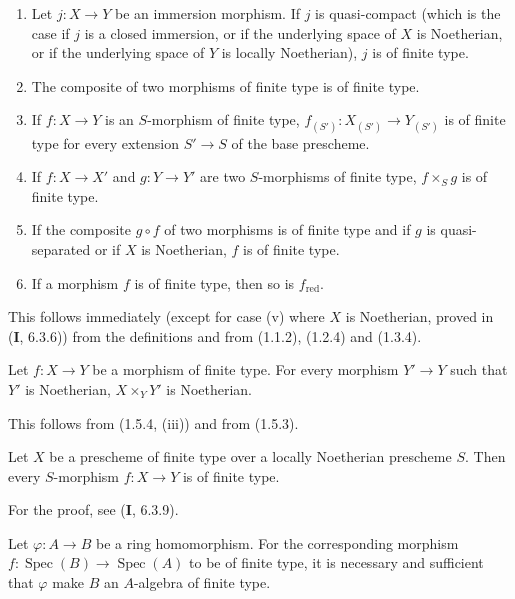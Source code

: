 \begin{proposition}[1.5.4]
\label{IV.1.5.4}
\begin{enumerate}
  \item[\textup{(i)}] Let $j:X\to Y$ be an immersion morphism. If $j$ is
  quasi-compact (which is the case if $j$ is a closed immersion, or if
  the underlying space of $X$ is Noetherian, or if the underlying space of
  $Y$ is locally Noetherian), $j$ is of finite type.
  \item[\textup{(ii)}] The composite of two morphisms of finite type is of finite type.
  \item[\textup{(iii)}] If $f:X\to Y$ is an $S$-morphism of finite type,
  $f_{(S')}:X_{(S')}\to Y_{(S')}$ is of finite type for every extension
  $S'\to S$ of the base prescheme.
  \item[\textup{(iv)}] If $f:X\to X'$ and $g:Y\to Y'$ are two $S$-morphisms of finite
  type, $f\times_Sg$ is of finite type.
  \item[\textup{(v)}] If the composite $g\circ f$ of two morphisms is of finite type
  and if $g$ is quasi-separated or if $X$ is Noetherian, $f$ is of finite type.
  \item[\textup{(vi)}] If a morphism $f$ is of finite type, then so is
  $f_{\mathrm{red}}$.
\end{enumerate}
\end{proposition}

This follows immediately (except for case (v) where $X$ is Noetherian, proved
in (\textbf{I}, 6.3.6)) from the definitions and from (1.1.2), (1.2.4) and (1.3.4).

\begin{corollary}[1.5.5]
\label{IV.1.5.5}
Let $f:X\to Y$ be a morphism of finite type. For every morphism $Y'\to Y$
such that $Y'$ is Noetherian, $X\times_YY'$ is Noetherian.
\end{corollary}

This follows from (1.5.4, (iii)) and from (1.5.3).

\begin{corollary}[1.5.6]
\label{IV.1.5.6}
Let $X$ be a prescheme of finite type over a locally Noetherian prescheme $S$.
Then every $S$-morphism $f:X\to Y$ is of finite type.
\end{corollary}

For the proof, see (\textbf{I}, 6.3.9).

\begin{proposition}[1.5.7]
\label{IV.1.5.7}
Let $\varphi:A\to B$ be a ring homomorphism. For the corresponding
morphism $f:\operatorname{Spec}(B)\to\operatorname{Spec}(A)$ to be of finite type, it is necessary and
sufficient that $\varphi$ make $B$ an $A$-algebra of finite type.
\end{proposition}


